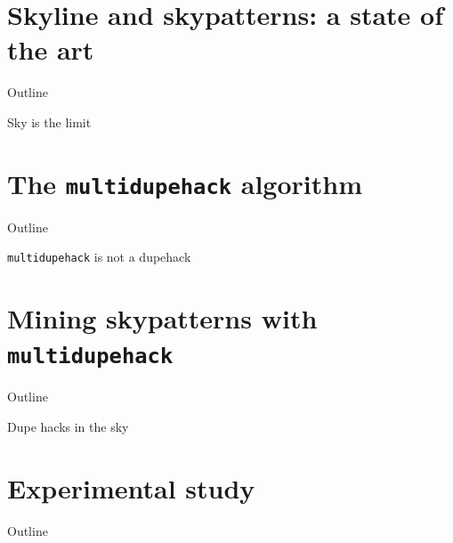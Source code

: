 \documentclass{beamer}
\newcommand{\mdh}{\texttt{multi\-dupe\-hack}}
\begin{document}
\section{Skyline and skypatterns: a state of the art}
\begin{frame}{Outline}
  \tableofcontents[currentsection]
\end{frame}

\begin{frame}{Sky is the limit}
  
\end{frame}

\section{The \mdh{} algorithm}
\begin{frame}{Outline}
  \tableofcontents[currentsection]
\end{frame}

\begin{frame}{\mdh{} is not a dupehack}
  
\end{frame}

\section{Mining skypatterns with \mdh{}}
\begin{frame}{Outline}
  \tableofcontents[currentsection]
\end{frame}

\begin{frame}{Dupe hacks in the sky}
  
\end{frame}

\section{Experimental study}
\begin{frame}{Outline}
  \tableofcontents[currentsection]
\end{frame}
\end{document}
